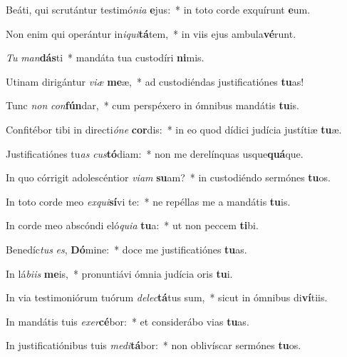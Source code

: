 \item Beáti, qui scrutántur testimó\textit{ni}\textit{a} \textbf{e}jus:~* in toto corde exquírunt \textbf{e}um.
\item Non enim qui operántur in\textit{i}\textit{qui}\textbf{tá}tem,~* in viis ejus ambula\textbf{vé}runt.
\item \textit{Tu} \textit{man}\textbf{dás}ti~* mandáta tua custodíri \textbf{ni}mis.
\item Utinam dirigántur \textit{vi}\textit{æ} \textbf{me}æ,~* ad custodiéndas justificatiónes \textbf{tu}as!
\item Tunc \textit{non} \textit{con}\textbf{fún}dar,~* cum perspéxero in ómnibus mandátis \textbf{tu}is.
\item Confitébor tibi in directi\textit{ó}\textit{ne} \textbf{cor}dis:~* in eo quod dídici judícia justítiæ \textbf{tu}æ.
\item Justificatiónes tu\textit{as} \textit{cus}\textbf{tó}diam:~* non me derelínquas usque\textbf{quá}que.
\item In quo córrigit adolescéntior \textit{vi}\textit{am} \textbf{su}am?~* in custodiéndo sermónes \textbf{tu}os.
\item In toto corde meo \textit{ex}\textit{qui}\textbf{sí}vi te:~* ne repéllas me a mandátis \textbf{tu}is.
\item In corde meo abscóndi eló\textit{qui}\textit{a} \textbf{tu}a:~* ut non peccem \textbf{ti}bi.
\item Benedíc\textit{tus} \textit{es}, \textbf{Dó}mine:~* doce me justificatiónes \textbf{tu}as.
\item In lá\textit{bi}\textit{is} \textbf{me}is,~* pronuntiávi ómnia judícia oris \textbf{tu}i.
\item In via testimoniórum tuórum \textit{de}\textit{lec}\textbf{tá}tus sum,~* sicut in ómnibus di\textbf{ví}tiis.
\item In mandátis tuis \textit{ex}\textit{er}\textbf{cé}bor:~* et considerábo vias \textbf{tu}as.
\item In justificatiónibus tuis \textit{me}\textit{di}\textbf{tá}bor:~* non oblivíscar sermónes \textbf{tu}os.
